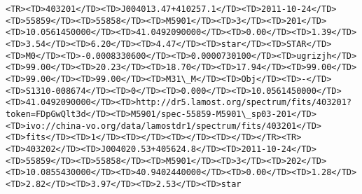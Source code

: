 \documentclass[11pt]{article}
\begin{document}
\begin{Verbatim}[commandchars=\\\{\}]
<TR><TD>403201</TD><TD>J004013.47+410257.1</TD><TD>2011-10-24</TD><TD>55859</TD><TD>55858</TD><TD>M5901</TD><TD>3</TD><TD>201</TD><TD>10.0561450000</TD><TD>41.0492090000</TD><TD>0.00</TD><TD>1.39</TD><TD>3.54</TD><TD>6.20</TD><TD>4.47</TD><TD>star</TD><TD>STAR</TD><TD>M0</TD><TD>-0.0008330600</TD><TD>0.0000730100</TD><TD>ugrizjh</TD><TD>99.00</TD><TD>20.23</TD><TD>18.70</TD><TD>17.94</TD><TD>99.00</TD><TD>99.00</TD><TD>99.00</TD><TD>M31\_M</TD><TD>Obj</TD><TD>-</TD><TD>S1310-008674</TD><TD>0</TD><TD>0.000</TD><TD>10.0561450000</TD><TD>41.0492090000</TD><TD>http://dr5.lamost.org/spectrum/fits/403201?token=FDpGwQlt3d</TD><TD>M5901/spec-55859-M5901\_sp03-201</TD><TD>ivo://china-vo.org/data/lamostdr1/spectrum/fits/403201</TD><TD>fits</TD><TD>1</TD><TD></TD><TD></TD><TD></TD></TR><TR><TD>403202</TD><TD>J004020.53+405624.8</TD><TD>2011-10-24</TD><TD>55859</TD><TD>55858</TD><TD>M5901</TD><TD>3</TD><TD>202</TD><TD>10.0855430000</TD><TD>40.9402440000</TD><TD>0.00</TD><TD>1.28</TD><TD>2.82</TD><TD>3.97</TD><TD>2.53</TD><TD>star     
\end{Verbatim}
\end{document}

